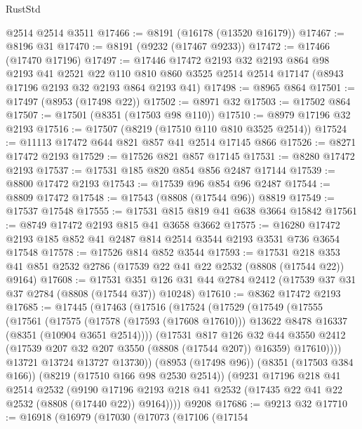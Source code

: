 \begin{lexlean}{RustStd}
\begin{coremodule}
    @2514
    @2514
    @3511
@17466 := @8191 (@16178 (@13520 @16179))
@17467 := @8196 @31
@17470 := @8191 (@9232 (@17467 @9233))
@17472 := @17466 (@17470 @17196)
@17497 := @17446
    @17472
    @2193
    @32
    @2193
    @864
    @98
    @2193
    @41
    @2521
    @22
    @110
    @810
    @860
    @3525
    @2514
    @2514
    @17147
    (@8943 @17196 @2193 @32 @2193 @864 @2193 @41)
@17498 := @8965 @864
@17501 := @17497 (@8953 (@17498 @22))
@17502 := @8971 @32
@17503 := @17502 @864
@17507 := @17501 (@8351 (@17503 @98 @110))
@17510 := @8979 @17196 @32 @2193
@17516 := @17507 (@8219 (@17510 @110 @810 @3525 @2514))
@17524 := @11113 @17472 @644 @821 @857 @41 @2514 @17145 @866
@17526 := @8271 @17472 @2193
@17529 := @17526 @821 @857 @17145
@17531 := @8280 @17472 @2193
@17537 := @17531 @185 @820 @854 @856 @2487 @17144
@17539 := @8800 @17472 @2193
@17543 := @17539 @96 @854 @96 @2487
@17544 := @8809 @17472
@17548 := @17543 (@8808 (@17544 @96)) @8819
@17549 := @17537 @17548
@17555 := @17531 @815 @819 @41 @638 @3664 @15842
@17561 := @8749 @17472 @2193 @815 @41 @3658 @3662
@17575 := @16280 @17472 @2193 @185 @852 @41 @2487 @814 @2514 @3544 @2193 @3531 @736 @3654 @17548
@17578 := @17526 @814 @852 @3544
@17593 := @17531
    @218
    @353
    @41
    @851
    @2532
    @2786
    (@17539 @22 @41 @22 @2532 (@8808 (@17544 @22)) @9164)
@17608 := @17531
    @351
    @126
    @31
    @44
    @2784
    @2412
    (@17539 @37 @31 @37 @2784 (@8808 (@17544 @37)) @10248)
@17610 := @8362 @17472 @2193
@17685 := @17445
    (@17463
      (@17516
        (@17524
          (@17529
            (@17549
              (@17555
                (@17561
                  (@17575
                    (@17578 (@17593 (@17608 @17610)))
                    @13622
                    @8478
                    @16337
                    (@8351 (@10904 @3651 @2514))))
                (@17531
                  @817
                  @126
                  @32
                  @44
                  @3550
                  @2412
                  (@17539 @207 @32 @207 @3550 (@8808 (@17544 @207)) @16359)
                  @17610))))
          @13721
          @13724
          @13727
          @13730))
      (@8953 (@17498 @96))
      (@8351 (@17503 @384 @166))
      (@8219 (@17510 @166 @98 @2530 @2514))
      (@9231
        @17196
        @218
        @41
        @2514
        @2532
        (@9190 @17196 @2193 @218 @41 @2532 (@17435 @22 @41 @22 @2532 (@8808 (@17440 @22)) @9164))))
    @9208
@17686 := @9213 @32
@17710 := @16918
    (@16979
      (@17030
        (@17073
          (@17106
            (@17154

\end{coremodule}
\end{lexlean}
